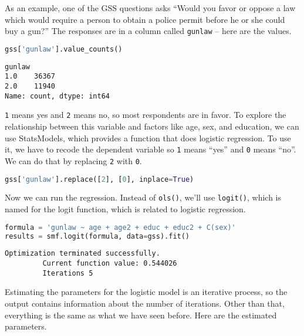 As an example, one of the GSS questions asks ``Would you favor or oppose
a law which would require a person to obtain a police permit before he
or she could buy a gun?'' The responses are in a column called
\passthrough{\lstinline!gunlaw!} -- here are the values.

\begin{lstlisting}[language=Python,style=source]
gss['gunlaw'].value_counts()
\end{lstlisting}

\begin{lstlisting}[style=output]
gunlaw
1.0    36367
2.0    11940
Name: count, dtype: int64
\end{lstlisting}

\passthrough{\lstinline!1!} means yes and \passthrough{\lstinline!2!}
means no, so most respondents are in favor. To explore the relationship
between this variable and factors like age, sex, and education, we can
use StatsModels, which provides a function that does logistic
regression. To use it, we have to recode the dependent variable so
\passthrough{\lstinline!1!} means ``yes'' and
\passthrough{\lstinline!0!} means ``no''. We can do that by replacing
\passthrough{\lstinline!2!} with \passthrough{\lstinline!0!}.

\begin{lstlisting}[language=Python,style=source]
gss['gunlaw'].replace([2], [0], inplace=True)
\end{lstlisting}

Now we can run the regression. Instead of
\passthrough{\lstinline!ols()!}, we'll use
\passthrough{\lstinline!logit()!}, which is named for the logit
function, which is related to logistic regression.

\begin{lstlisting}[language=Python,style=source]
formula = 'gunlaw ~ age + age2 + educ + educ2 + C(sex)'
results = smf.logit(formula, data=gss).fit()
\end{lstlisting}

\begin{lstlisting}[style=output]
Optimization terminated successfully.
         Current function value: 0.544026
         Iterations 5
\end{lstlisting}

Estimating the parameters for the logistic model is an iterative
process, so the output contains information about the number of
iterations. Other than that, everything is the same as what we have seen
before. Here are the estimated parameters.

